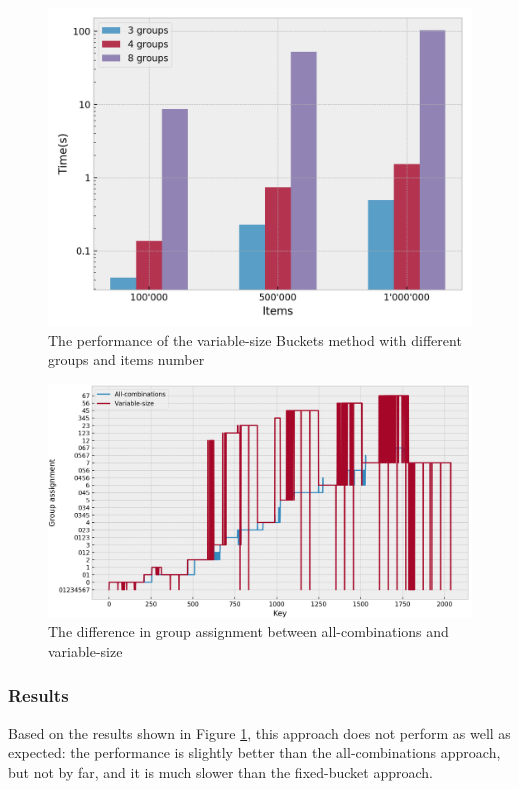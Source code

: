 \begin{figure}[!htb]
  \centering
  \includegraphics[width=\textwidth,height=\textheight,keepaspectratio]{img/dynamic.png}
  \caption{The performance of the variable-size Buckets method with different groups and items number}
  \label{fig:dynamic}
\end{figure}

\begin{figure}[!htb]
  \centering
  \includegraphics[width=\textwidth,height=\textheight,keepaspectratio]{img/partition_difference_variable_all.png}
  \caption{The difference in group assignment between all-combinations and variable-size}
  \label{fig:variable-partitioning}
\end{figure}

\subsubsection{Results}
Based on the results shown in Figure \ref{fig:dynamic}, this approach does not perform as well as expected: the performance is slightly better than the all-combinations approach, but not by far, and it is much slower than the fixed-bucket approach.

